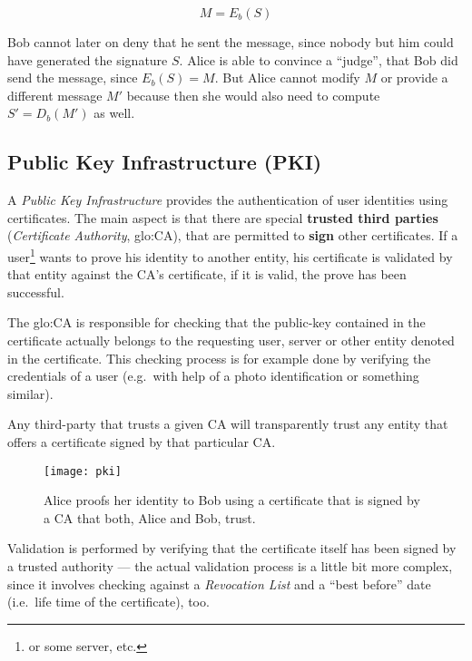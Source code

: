 \begin{equation*}
  \label{eq:validate-signature}
  M = E_b(S)
\end{equation*}

Bob cannot  later on deny that he  sent the message, since  nobody but him
could  have generated  the signature  $S$.  Alice  is able  to  convince a
``judge'', that  Bob did send the  message, since $E_b(S) =  M$. But Alice
cannot modify  $M$ or  provide a different  message $M'$ because  then she
would also need to compute $S' = D_b(M')$ as well.

\subsection[Public Key Infrastructure]{Public Key Infrastructure (PKI)}

A  \emph{Public Key  Infrastructure} provides  the authentication  of user
identities using certificates.  The main  aspect is that there are special
\textbf{trusted    third     parties}    (\emph{Certificate    Authority},
\gls{glo:CA}), that are permitted  to \textbf{sign} other certificates. If
a  user\footnote{or some  server, etc.}   wants to  prove his  identity to
another entity,  his certificate is  validated by that entity  against the
CA's certificate, if it is valid, the prove has been successful.

The \gls{glo:CA} is responsible for checking that the public-key contained
in  the certificate  actually belongs  to the  requesting user,  server or
other  entity denoted  in the  certificate. This  checking process  is for
example done by  verifying the credentials of a user  (e.g.~with help of a
photo identification or something similar).

Any third-party that trusts a given CA will transparently trust any entity
that offers a certificate signed by that particular CA.

\begin{figure}[h]
  \centering
  \texttt{[image: pki]}
  \caption[Public  Key Infrastructure]{Alice  proofs her  identity  to Bob
    using a certificate  that is signed by a CA that  both, Alice and Bob,
    trust.}
  \label{fig:pki}
\end{figure}

Validation is performed by verifying  that the certificate itself has been
signed  by a  trusted authority  --- the  actual validation  process  is a
little   bit  more  complex,   since  it   involves  checking   against  a
\emph{Revocation List} and  a ``best before'' date (i.e.~life  time of the
certificate), too.

